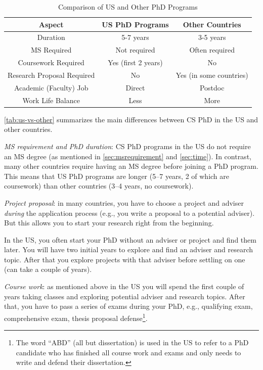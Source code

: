 \documentclass[oneside,11pt,dvipsnames]{book}
\begin{document}
\begin{table}
\caption{Comparison of US and Other PhD Programs}\label{tab:us-vs-other}
\begin{tabular}{c|c|c}
\toprule
\textbf{Aspect} & \textbf{US PhD Programs} & \textbf{Other Countries} \\
\midrule
Duration & 5-7 years & 3-5 years \\
MS Required & Not required & Often required \\
Coursework Required & Yes (first 2 years) & No \\
Research Proposal Required & No & Yes (in some countries) \\
Academic (Faculty) Job & Direct & Postdoc \\
Work Life Balance & Less & More \\
\bottomrule
\end{tabular}
\end{table}


\autoref{tab:us-vs-other} summarizes the main differences between CS PhD in the US and other countries. %

\emph{MS requirement and PhD duration}:  CS PhD programs in the US do not require an MS degree (as mentioned in \autoref{sec:msrequirement} and \autoref{sec:time}).  In contrast, many other countries require having an MS degree before joining a PhD program.  This means that US PhD programs are longer (5--7 years, 2 of which are coursework) than other countries (3--4 years, no coursework).

\emph{Project proposal}: in many countries, you have to choose a project and adviser \emph{during} the application process (e.g., you write a proposal to a potential adviser). But this allows you to start your research right from the beginning. 

In the US, you often start your PhD without an adviser or project and find them later. You will have two initial years to explore and find an adviser and research topic. After that you explore projects with that adviser before settling on one (can take a couple of years). 

\emph{Course work}: as mentioned above in the US you will spend the first couple of years taking classes and exploring potential adviser and research topics. 
After that, you have to pass a series of exams during your PhD, e.g., qualifying exam, comprehensive exam, thesis proposal defense\footnote{The word ``ABD'' (all but dissertation) is used in the US to refer to a PhD candidate who has finished all course work and exams and only needs to write and defend their dissertation.}.
\end{document}
